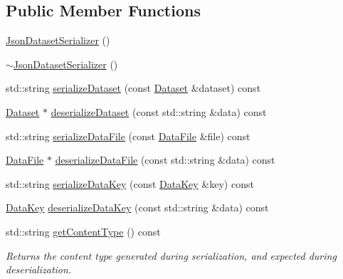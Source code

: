\subsection*{Public Member Functions}
\begin{DoxyCompactItemize}
\item 
\hyperlink{classBUSBOY_1_1JsonDatasetSerializer_a93e1db108ed8b28803332111bbaaa71b}{JsonDatasetSerializer} ()
\item 
\hyperlink{classBUSBOY_1_1JsonDatasetSerializer_ad61d353b7faeba18e9b99da5552212c5}{$\sim$JsonDatasetSerializer} ()
\item 
std::string \hyperlink{classBUSBOY_1_1JsonDatasetSerializer_add2bc8fa98d80ed23fd782af66ad9ef2}{serializeDataset} (const \hyperlink{classBUSBOY_1_1Dataset}{Dataset} \&dataset) const 
\item 
\hyperlink{classBUSBOY_1_1Dataset}{Dataset} $\ast$ \hyperlink{classBUSBOY_1_1JsonDatasetSerializer_a2e3d76a4ee7e7e3afcfef509b3e8a289}{deserializeDataset} (const std::string \&data) const 
\item 
std::string \hyperlink{classBUSBOY_1_1JsonDatasetSerializer_adc5513d517be053ec289589702f5a599}{serializeDataFile} (const \hyperlink{classBUSBOY_1_1DataFile}{DataFile} \&file) const 
\item 
\hyperlink{classBUSBOY_1_1DataFile}{DataFile} $\ast$ \hyperlink{classBUSBOY_1_1JsonDatasetSerializer_af9ef2ac427bb99fd0f1d0f99774f3765}{deserializeDataFile} (const std::string \&data) const 
\item 
std::string \hyperlink{classBUSBOY_1_1JsonDatasetSerializer_ac4888a2de49c410d35b77e5d4d6ed04a}{serializeDataKey} (const \hyperlink{classBUSBOY_1_1DataKey}{DataKey} \&key) const 
\item 
\hyperlink{classBUSBOY_1_1DataKey}{DataKey} \hyperlink{classBUSBOY_1_1JsonDatasetSerializer_ac4cadb7d348a3fe201a360de2100b02f}{deserializeDataKey} (const std::string \&data) const 
\item 
std::string \hyperlink{classBUSBOY_1_1JsonDatasetSerializer_a80f71734e5e99b3230cfdca597f6d636}{getContentType} () const 
\begin{DoxyCompactList}\small\item\em Returns the content type generated during serialization, and expected during deserialization. \item\end{DoxyCompactList}\end{DoxyCompactItemize}


